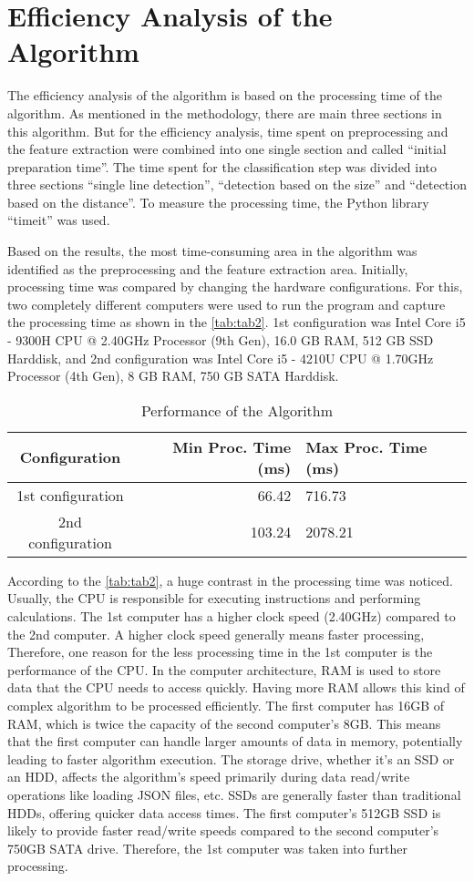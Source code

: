 \documentclass[]{iat}
\begin{document}
\section{Efficiency Analysis of the Algorithm}

The efficiency analysis of the algorithm is based on the processing time of the algorithm. As mentioned in the methodology, there are main three sections in this algorithm. But for the efficiency analysis, time spent on preprocessing and the feature extraction were combined into one single section and called “initial preparation time”. The time spent for the classification step was divided into three sections “single line detection”, “detection based on the size” and “detection based on the distance”. To measure the processing time, the Python library “timeit” was used.
\par
Based on the results, the most time-consuming area in the algorithm was identified as the preprocessing and the feature extraction area. Initially, processing time was compared by changing the hardware configurations. For this, two completely different computers were used to run the program and capture the processing time as shown in the \autoref{tab:tab2}. 1st configuration was Intel Core i5 - 9300H CPU @ 2.40GHz Processor (9th Gen), 16.0 GB RAM, 512 GB SSD Harddisk, and 2nd configuration was Intel Core i5 - 4210U CPU @ 1.70GHz Processor (4th Gen), 8 GB RAM, 750 GB SATA Harddisk.
\par
\FloatBarrier
\begin{table}[h]
\begin{tabular}{crl}
\hline
Configuration & Min Proc. Time (ms) & Max Proc. Time (ms)\\\hline
1st configuration & 66.42  & 716.73 \\
2nd configuration & 103.24 & 2078.21 \\\hline
\end{tabular}
\caption{Performance of the Algorithm}
\label{tab:tab2}
\end{table}
According to the \autoref{tab:tab2}, a huge contrast in the processing time was noticed. Usually, the CPU is responsible for executing instructions and performing calculations. The 1st computer has a higher clock speed (2.40GHz) compared to the 2nd computer. A higher clock speed generally means faster processing, Therefore, one reason for the less processing time in the 1st computer is the performance of the CPU. In the computer architecture, RAM is used to store data that the CPU needs to access quickly. Having more RAM allows this kind of complex algorithm to be processed efficiently. The first computer has 16GB of RAM, which is twice the capacity of the second computer's 8GB. This means that the first computer can handle larger amounts of data in memory, potentially leading to faster algorithm execution. The storage drive, whether it's an SSD or an HDD, affects the algorithm's speed primarily during data read/write operations like loading JSON files, etc. SSDs are generally faster than traditional HDDs, offering quicker data access times. The first computer's 512GB SSD is likely to provide faster read/write speeds compared to the second computer's 750GB SATA drive. Therefore, the 1st computer was taken into further processing. 
\end{document}
